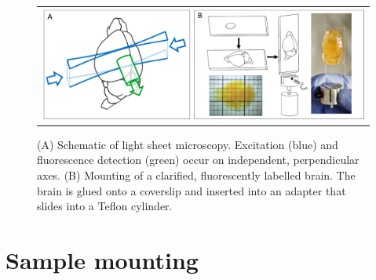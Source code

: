 \documentclass[12pt]{spieman}  %
\begin{document}
\begin{figure}
   \begin{center}
   \begin{tabular}{c}
   \includegraphics[width=\textwidth]{PanelSampel.eps}
   \end{tabular}
   \end{center}
   \caption{\label{fig:Panel0} (A) Schematic of light sheet microscopy. Excitation (blue) and fluorescence detection (green) occur on independent, perpendicular axes. (B) Mounting of a clarified, fluorescently labelled brain. The brain is glued onto a coverslip and inserted into an adapter that slides into a Teflon cylinder.} 
   \end{figure}



\section{Sample mounting}
%
		
\end{document}
